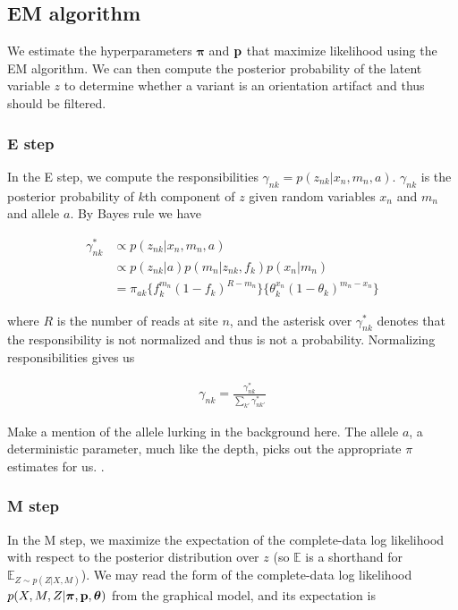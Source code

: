 \documentclass[a4paper]{article}
\newcommand{\vp}{{\bf p}}
\newcommand{\vpi}{{\bm \pi}}
\newcommand{\vtheta}{{\bm \theta}}
\newcommand{\E}{\mathbb{E}}
\begin{document}

\subsection{EM algorithm}
We estimate the hyperparameters $\vpi$ and $\vp$ that maximize likelihood using the EM algorithm. We can then compute the posterior probability of the latent variable $z$ to determine whether a variant is an orientation artifact and thus should be filtered.

\subsubsection{E step}
In the E step, we compute the responsibilities $\gamma_{nk} = p(z_{nk} | x_n, m_n, a)$. $\gamma_{nk}$ is the posterior probability of $k$th component of $z$ given random variables $x_n$ and $m_n$ and allele $a$. By Bayes rule we have 

\begin{align}
\gamma^*_{nk} &\propto p(z_{nk} | x_n, m_n, a) \nonumber \\
		        &\propto p(z_{nk} | a) p(m_n | z_{nk}, f_{k} ) p(x_n | m_n ) \nonumber \\
		        &= \pi_{ak}  \{ f_{k}^{m_n} (1-f_k)^{R - m_n} \} \{ \theta_k^{x_n} (1 - \theta_k)^{m_n - x_n} \}
\end{align}


where $R$ is the number of reads at site $n$, and the asterisk over $\gamma^*_{nk}$ denotes that the responsibility is not normalized and thus is not a probability. Normalizing responsibilities gives us

\begin{align}
\gamma_{nk} = \frac{\gamma^*_{nk}}{\sum_{k'} \gamma^*_{nk'}}
\end{align}

Make a mention of the allele lurking in the background here. The allele $a$, a deterministic parameter, much like the depth, picks out the appropriate $\pi$ estimates for us.  . 

\subsubsection{M step}
In the M step, we maximize the expectation of the complete-data log likelihood with respect to the posterior distribution over $z$ (so $\E$ is a shorthand for $\E_{Z \sim p(Z|X,M)}$). We may read the form of the complete-data log likelihood $p(X, M, Z | \vpi, \vp, \vtheta)$ from the graphical model, and its expectation is
\end{document}
